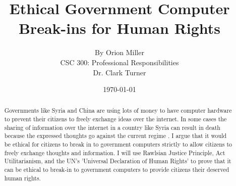 \documentclass[11pt]{article}
\begin{document}
\title{\vfill Ethical Government Computer Break-ins for Human Rights} %
\author{
By Orion Miller\vspace{10pt} \\
CSC 300: Professional Responsibilities\vspace{10pt} \\
Dr. Clark Turner\vspace{10pt} \\
}
\date{\today}

\maketitle

\vfill  %
\begin{abstract}
Governments like Syria and China are using lots of money to have computer hardware to prevent their citizens to freely exchange ideas over the internet. In some cases the sharing of information over the internet in a country like Syria can result in death because the expressed thoughts go against the current regime \cite{SixthJournalistKilled}. I argue that it would be ethical for citizens to break in to government computers strictly to allow citizens to freely exchange thoughts and information. I will use Rawlsian Justice Principle, Act Utilitarianism, and the UN's 'Universal Declaration of Human Rights' to prove that it can be ethical to break-in to government computers to provide citizens their deserved human rights.
\end{abstract}

\thispagestyle{empty} %
\newpage


\thispagestyle{empty}  %
\tableofcontents

\newpage

\end{document}
